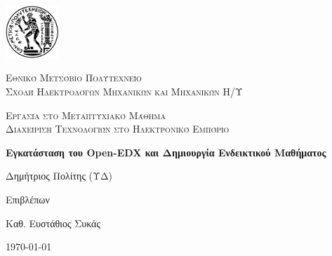 \documentclass[12pt]{report}
\newcommand\blankpage{%
    \null
    \thispagestyle{empty}%
    \addtocounter{page}{-1}%
    \newpage}
\begin{document}

\hypersetup{pageanchor=false}

\begin{titlepage}
  \centering
  \includegraphics[width=0.15\textwidth]{pyrforos}\par\vspace{1cm}
  {\scshape\LARGE Εθνικό Μετσόβιο Πολυτεχνείο\\
  Σχολή Ηλεκτρολόγων Μηχανικών και Μηχανικών Η/Υ\par}
  \vspace{1cm}
  {\scshape\Large Εργασία στο Μεταπτυχιακό Μάθημα\\
  Διαχείριση Τεχνολογιών στο Ηλεκτρονικό Εμπόριο\par}
  \vspace{1.5cm}
  {\Large\bfseries Εγκατάσταση του Open-EDX και Δημιουργία Ενδεικτικού Μαθήματος\par}
  \vspace{2cm}
  {\large Δημήτριος Πολίτης (ΥΔ)\par}
  \vfill
  Επιβλέπων \par
  Καθ. Ευστάθιος Συκάς

  \vfill

  {\large \today\par}
  \afterpage{\blankpage}
\end{titlepage}

\tableofcontents
\thispagestyle{empty}

\listoffigures
\thispagestyle{empty}

\begin{abstract}
Στο παρόν παρουσιάζεται η λειτουργία και η διαδικασία ανάπτυξης ενός μαθήματος στην πλατφόρμα \textlatin{Open-EDX}. Αρχικά  γίνεται αναφορά στην εν λόγω πλατφόρμα ηλεκτρονικής μάθησης και στη συνέχεια περιγράφεται αναλυτικά η διαδικασία εγκατάστασης της, με τη χρήση αυτοματοποιημένων εργαλείων (\textlatin{ansible, vagrant}). Τέλος περιγράφεται ο τρόπος δημιουργίας εντός τής πλατφόρμας, ενός ενδεικτικού μαθήματος. Η εργασία είναι διαθέσιμη από το σύνδεσμο \textlatin{\url{https://github.com/dpolitis/open-edx-install}}.

\vspace{10mm}

\noindent \textbf{Λέξεις κλειδιά:} Ηλεκτρονική Μάθηση, Ανοιχτός Κώδικας, Διαδίκτυο.
\end{abstract}
\end{document}

